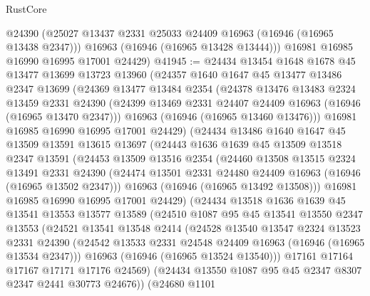 \begin{lexlean}{RustCore}
\begin{coremodule}
        @24390
        (@25027 @13437 @2331 @25033 @24409 @16963 (@16946 (@16965 @13438 @2347)))
        @16963
        (@16946 (@16965 @13428 @13444)))
      @16981
      @16985
      @16990
      @16995
      @17001
      @24429)
@41945 := @24434
    @13454
    @1648
    @1678
    @45
    @13477
    @13699
    @13723
    @13960
    (@24357
      @1640
      @1647
      @45
      @13477
      @13486
      @2347
      @13699
      (@24369
        @13477
        @13484
        @2354
        (@24378
          @13476
          @13483
          @2324
          @13459
          @2331
          @24390
          (@24399 @13469 @2331 @24407 @24409 @16963 (@16946 (@16965 @13470 @2347)))
          @16963
          (@16946 (@16965 @13460 @13476)))
        @16981
        @16985
        @16990
        @16995
        @17001
        @24429)
      (@24434
        @13486
        @1640
        @1647
        @45
        @13509
        @13591
        @13615
        @13697
        (@24443
          @1636
          @1639
          @45
          @13509
          @13518
          @2347
          @13591
          (@24453
            @13509
            @13516
            @2354
            (@24460
              @13508
              @13515
              @2324
              @13491
              @2331
              @24390
              (@24474 @13501 @2331 @24480 @24409 @16963 (@16946 (@16965 @13502 @2347)))
              @16963
              (@16946 (@16965 @13492 @13508)))
            @16981
            @16985
            @16990
            @16995
            @17001
            @24429)
          (@24434
            @13518
            @1636
            @1639
            @45
            @13541
            @13553
            @13577
            @13589
            (@24510
              @1087
              @95
              @45
              @13541
              @13550
              @2347
              @13553
              (@24521
                @13541
                @13548
                @2414
                (@24528
                  @13540
                  @13547
                  @2324
                  @13523
                  @2331
                  @24390
                  (@24542 @13533 @2331 @24548 @24409 @16963 (@16946 (@16965 @13534 @2347)))
                  @16963
                  (@16946 (@16965 @13524 @13540)))
                @17161
                @17164
                @17167
                @17171
                @17176
                @24569)
              (@24434 @13550 @1087 @95 @45 @2347 @8307 @2347 @2441 @30773 @24676))
            (@24680
              @1101

\end{coremodule}
\end{lexlean}
